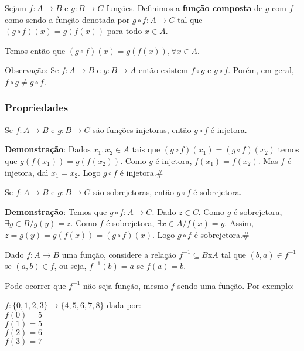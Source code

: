 \begin{definicao}
	Sejam $f : A \to B$ e $g : B \to C$ funções. Definimos a \textbf{função composta} de $g$ com $f$ como sendo a função denotada por $g \circ f : A \to C$ tal que $(g\circ f)(x) = g(f(x))$ para todo $x \in A$.
\end{definicao}

Temos ent{\~a}o que $(g\circ f)(x)=g(f(x)), \forall x\in A$.

Observa{\c c}{\~a}o: Se $f:A\rightarrow B$ e $g:B\rightarrow A$ ent{\~a}o existem $f\circ g$ e $g\circ f$. Por{\'e}m, em geral, $f\circ g\neq g\circ f$.

\subsubsection{Propriedades}
\begin{proposicao} Se $f:A\rightarrow B$ e $g:B\rightarrow C$ s{\~a}o fun{\c c}{\~o}es injetoras, ent{\~a}o $g\circ f$ {\'e} injetora.\end{proposicao}

\textbf{Demonstra{\c c}{\~a}o}: Dados $x_{1},x_{2}\in A$ tais que $(g\circ f)(x_{1})=(g\circ f)(x_{2})$ temos que $g(f(x_{1}))=g(f(x_{2}))$. Como $g$ {\'e} injetora, $f(x_{1})=f(x_{2})$. Mas $f$ {\'e} injetora, da{\'\i} $x_{1}=x_{2}$. Logo $g\circ f$ {\'e} injetora.\#

\begin{proposicao} Se $f:A\rightarrow B$ e $g:B\rightarrow C$ s{\~a}o sobrejetoras, ent{\~a}o $g\circ f$ {\'e} sobrejetora.\end{proposicao}

\textbf{Demonstra{\c c}{\~a}o}: Temos que $g\circ f:A\rightarrow C$. Dado $z\in C$. Como $g$ {\'e} sobrejetora, $\exists y\in B/g(y)=z$. Como $f$ {\'e} sobrejetora, $\exists x\in A/f(x)=y$. Assim, $z=g(y)=g(f(x))=(g\circ f)(x)$. Logo $g\circ f$ {\'e} sobrejetora.\#

Dado $f:A\rightarrow B$ uma funç{\~a}o, considere a relaç{\~a}o $f^{-1}\subseteq B$x$A$ tal que $(b,a)\in f^{-1}$ se $(a,b)\in f$, ou seja, $f^{-1}(b)=a$ se $f(a)=b$.

Pode ocorrer que $f^{-1}$ n{\~a}o seja funç{\~a}o, mesmo $f$ sendo uma funç{\~a}o. Por exemplo:

$f:\{0,1,2,3\}\rightarrow\{4,5,6,7,8\}$ dada por:\\
$f(0)=5$\\
$f(1)=5$\\
$f(2)=6$\\
$f(3)=7$


